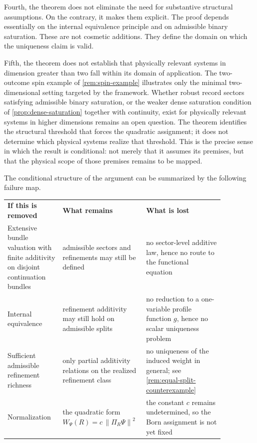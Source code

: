 \documentclass[11pt]{article}
\theoremstyle{remark}
\numberwithin{equation}{section}
\newcommand{\Wpsi}[1]{W_{\Psi}\!\left(#1\right)}
\newcommand{\Proj}[1]{\Pi_{#1}}
\newcommand{\norm}[1]{\left\lVert #1 \right\rVert}
\begin{document}
Fourth, the theorem does not eliminate the need for substantive structural assumptions. On the contrary, it makes them explicit. The proof depends essentially on the internal equivalence principle and on admissible binary saturation. These are not cosmetic additions. They define the domain on which the uniqueness claim is valid.

Fifth, the theorem does not establish that physically relevant systems in dimension greater than two fall within its domain of application. The two-outcome spin example of \cref{rem:spin-example} illustrates only the minimal two-dimensional setting targeted by the framework. Whether robust record sectors satisfying admissible binary saturation, or the weaker dense saturation condition of \cref{prop:dense-saturation} together with continuity, exist for physically relevant systems in higher dimensions remains an open question. The theorem identifies the structural threshold that forces the quadratic assignment; it does not determine which physical systems realize that threshold. This is the precise sense in which the result is conditional: not merely that it assumes its premises, but that the physical scope of those premises remains to be mapped.

The conditional structure of the argument can be summarized by the following failure map.

\begin{center}
\renewcommand{\arraystretch}{1.15}
\begin{tabular}{%
  >{\raggedright\arraybackslash}p{0.24\linewidth}
  >{\raggedright\arraybackslash}p{0.28\linewidth}
  >{\raggedright\arraybackslash}p{0.34\linewidth}}
\textbf{If this is removed} & \textbf{What remains} & \textbf{What is lost} \\[0.3em]
Extensive bundle valuation with finite additivity on disjoint continuation bundles
& admissible sectors and refinements may still be defined
& no sector-level additive law, hence no route to the functional equation \\[0.5em]
Internal equivalence
& refinement additivity may still hold on admissible splits
& no reduction to a one-variable profile function $g$, hence no scalar uniqueness problem \\[0.5em]
Sufficient admissible refinement richness
& only partial additivity relations on the realized refinement class
& no uniqueness of the induced weight in general; see \cref{rem:equal-split-counterexample} \\[0.5em]
Normalization
& the quadratic form $\Wpsi{R} = c\,\norm{\Proj{R}\Psi}^2$
& the constant $c$ remains undetermined, so the Born assignment is not yet fixed
\end{tabular}
\end{center}
\end{document}

